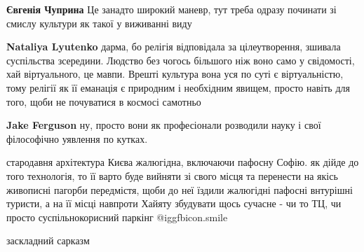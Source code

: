 \begin{itemize}
\begin{itemize}
\textbf{Євгенія Чуприна} Це занадто широкий маневр, тут треба одразу починати зі смислу культури як такої у виживанні виду


 
\textbf{Nataliya Lyutenko} дарма, бо релігія відповідала за цілеутворення, зшивала суспільства зсередини. Людство без чогось більшого ніж воно само у свідомості, хай віртуального, це мавпи. Врешті культура вона уся по суті є віртуальністю, тому релігії як її еманація є природним і необхідним явищем, просто навіть для того, щоби не почуватися в космосі самотньо


 
\textbf{Jake Ferguson} ну, просто вони як професіонали розводили науку і свої філософічно уявлення по кутках.
\end{itemize} %

 

стародавня архітектура Києва жалюгідна, включаючи пафосну Софію. як дійде до
того технологія, то її варто буде вийняти зі свого місця та перенести на якісь
живописні пагорби передмістя, щоби до неї їздили жалюгідні пафосні внтурішні
туристи, а на її місці навпроти Хайяту збудувати щось сучасне - чи то ТЦ, чи
просто суспільнокорисний паркінг  @igg{fbicon.smile} 

\begin{itemize} %
 
заскладний сарказм

 

\end{itemize}
\end{itemize}
